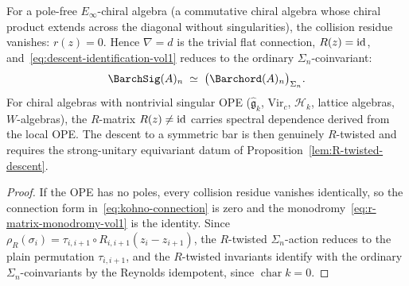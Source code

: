 \begin{corollary}
\ClaimStatusProvedHere
\label{cor:pole-free-descent}
For a pole-free $E_\infty$-chiral algebra \textup{(}a commutative chiral
algebra whose chiral product extends across the diagonal without
singularities\textup{)}, the collision residue vanishes:
$r(z)=0$. Hence $\nabla=d$ is the trivial flat connection,
$R(z)=\mathrm{id}$, and~\eqref{eq:descent-identification-vol1} reduces to
the ordinary $\Sigma_n$-coinvariant:
\[
\BarchSig(A)_n
\;\simeq\;
\bigl(\Barchord(A)_n\bigr)_{\Sigma_n}.
\]
For chiral algebras with nontrivial singular OPE
\textup{(}$\widehat{\mathfrak{g}}_k$, $\mathrm{Vir}_c$,
$\mathcal{H}_k$, lattice algebras, $W$-algebras\textup{)}, the
$R$-matrix $R(z)\neq\mathrm{id}$ carries spectral dependence derived from the
local OPE. The descent to a symmetric bar is then genuinely
$R$-twisted and requires the strong-unitary equivariant datum of
Proposition~\ref{lem:R-twisted-descent}.
\end{corollary}

\begin{proof}
If the OPE has no poles, every collision residue vanishes identically,
so the connection form in~\eqref{eq:kohno-connection} is zero and the
monodromy~\eqref{eq:r-matrix-monodromy-vol1} is the identity.
Since
\(\rho_R(\sigma_i)=\tau_{i,i+1}\circ R_{i,i+1}(z_i-z_{i+1})\),
the $R$-twisted $\Sigma_n$-action reduces to the plain permutation
$\tau_{i,i+1}$, and the
$R$-twisted invariants identify with the ordinary
$\Sigma_n$-coinvariants by the Reynolds idempotent, since
\(\operatorname{char} k=0\).
\end{proof}


